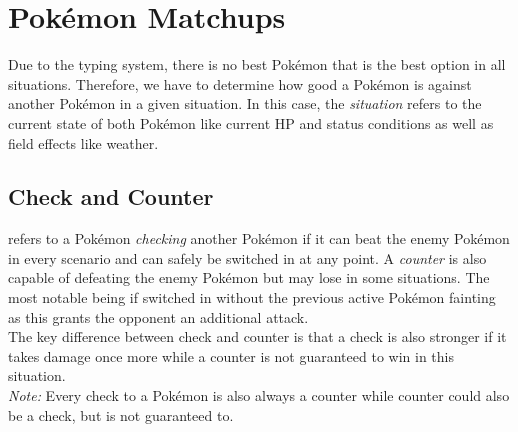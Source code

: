 \section{Pokémon Matchups}
Due to the typing system, there is no best Pokémon that is the best option in all situations. Therefore, we 
have to determine how good a Pokémon is against another Pokémon in a given situation. In this case, the
\textit{situation} refers to the current state of both Pokémon like current \ac{HP} and status conditions
as well as field effects like weather. 
\subsection{Check and Counter}
\cite{Smogon:CheckCounter} refers to a Pokémon \textit{checking} another Pokémon if it can beat the enemy Pokémon in 
every scenario and can safely be switched in at any point. A \textit{counter} is also capable of defeating
the enemy Pokémon but may lose in some situations. The most notable being if switched in without the
previous active Pokémon fainting as this grants the opponent an additional attack. \\
The key difference between check and counter is that a check is also stronger if
it takes damage once more while a counter is not guaranteed to win in this situation. \\
\textit{Note:} Every check to a Pokémon is also always a counter while counter
could also be a check, but is not guaranteed to. 